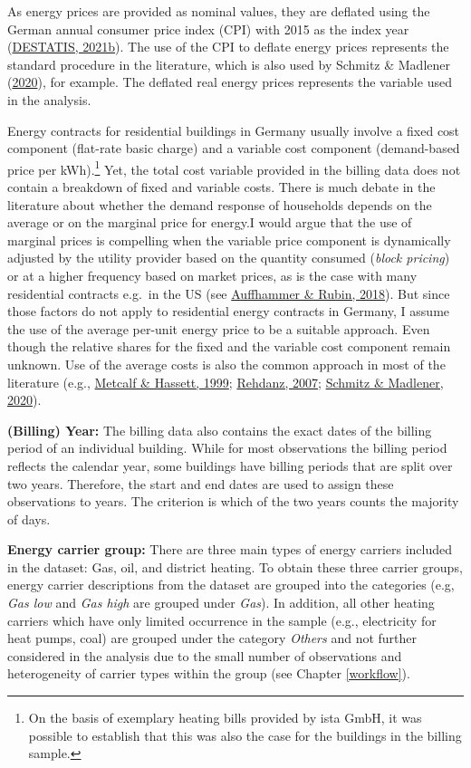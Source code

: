 \documentclass[12pt,twoside]{reedthesis}
\begin{document}
As energy prices are provided as nominal values, they are deflated using the German annual consumer price index (CPI) with 2015 as the index year (\protect\hyperlink{ref-destatis21}{DESTATIS, 2021b}). The use of the CPI to deflate energy prices represents the standard procedure in the literature, which is also used by Schmitz \& Madlener (\protect\hyperlink{ref-schmitz_madlener20}{2020}), for example. The deflated real energy prices represents the variable used in the analysis.

Energy contracts for residential buildings in Germany usually involve a fixed cost component (flat-rate basic charge) and a variable cost component (demand-based price per kWh).\footnote{On the basis of exemplary heating bills provided by ista GmbH, it was possible to establish that this was also the case for the buildings in the billing sample.} Yet, the total cost variable provided in the billing data does not contain a breakdown of fixed and variable costs. There is much debate in the literature about whether the demand response of households depends on the average or on the marginal price for energy.I would argue that the use of marginal prices is compelling when the variable price component is dynamically adjusted by the utility provider based on the quantity consumed (\emph{block pricing}) or at a higher frequency based on market prices, as is the case with many residential contracts e.g.~in the US (see \protect\hyperlink{ref-auffhammer_rubin18}{Auffhammer \& Rubin, 2018}). But since those factors do not apply to residential energy contracts in Germany, I assume the use of the average per-unit energy price to be a suitable approach. Even though the relative shares for the fixed and the variable cost component remain unknown. Use of the average costs is also the common approach in most of the literature (e.g., \protect\hyperlink{ref-metcalf_hassett99}{Metcalf \& Hassett, 1999}; \protect\hyperlink{ref-rehdanz07}{Rehdanz, 2007}; \protect\hyperlink{ref-schmitz_madlener20}{Schmitz \& Madlener, 2020}).

\textbf{(Billing) Year:} The billing data also contains the exact dates of the billing period of an individual building. While for most observations the billing period reflects the calendar year, some buildings have billing periods that are split over two years. Therefore, the start and end dates are used to assign these observations to years. The criterion is which of the two years counts the majority of days.

\textbf{Energy carrier group:} There are three main types of energy carriers included in the dataset: Gas, oil, and district heating. To obtain these three carrier groups, energy carrier descriptions from the dataset are grouped into the categories (e.g, \emph{Gas low} and \emph{Gas high} are grouped under \emph{Gas}). In addition, all other heating carriers which have only limited occurrence in the sample (e.g., electricity for heat pumps, coal) are grouped under the category \emph{Others} and not further considered in the analysis due to the small number of observations and heterogeneity of carrier types within the group (see Chapter \ref{workflow}).
\end{document}
